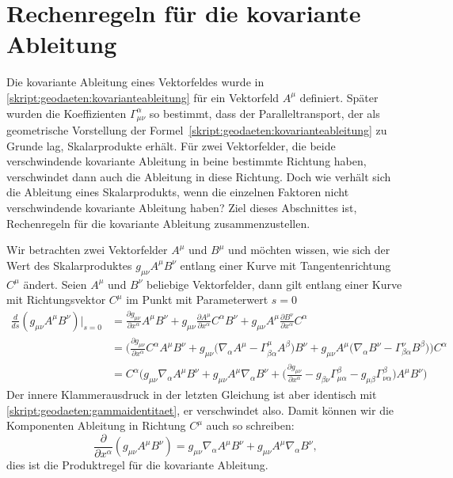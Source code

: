 \section{Rechenregeln für die kovariante Ableitung}
Die kovariante Ableitung eines Vektorfeldes wurde in 
\eqref{skript:geodaeten:kovarianteableitung}
für ein Vektorfeld $A^\mu$ definiert.
Später wurden die Koeffizienten $\Gamma^\alpha_{\mu\nu}$ so bestimmt,
dass der Paralleltransport, der als geometrische Vorstellung der
Formel~\eqref{skript:geodaeten:kovarianteableitung} zu Grunde lag,
Skalarprodukte erhält.
Für zwei Vektorfelder, die beide verschwindende
kovariante Ableitung in beine bestimmte Richtung haben,
verschwindet dann auch die Ableitung in diese Richtung.
Doch wie verhält sich die Ableitung eines Skalarprodukts, wenn
die einzelnen Faktoren nicht verschwindende kovariante Ableitung haben?
Ziel dieses Abschnittes ist, Rechenregeln für die kovariante Ableitung
zusammenzustellen.

Wir betrachten zwei Vektorfelder $A^\mu$ und $B^\mu$ und möchten wissen,
wie sich der Wert des Skalarproduktes $g_{\mu\nu}A^\mu B^\nu$ entlang
einer Kurve mit Tangentenrichtung $C^\mu$ ändert.
Seien $A^\mu$  und $B^\nu$ beliebige Vektorfelder,
dann gilt entlang einer Kurve mit
Richtungsvektor $C^\mu$ im Punkt mit Parameterwert $s=0$
\begin{align*}
\frac{d}{ds}(g_{\mu\nu}A^\mu B^\nu)\bigg|_{s=0}
&=
\frac{\partial g_{\mu\nu}}{\partial x^\alpha}A^\mu B^\nu
+
g_{\mu\nu}\frac{\partial A^\mu}{\partial x^\alpha}C^\alpha B^\nu
+
g_{\mu\nu}A^\mu \frac{\partial B^\nu}{\partial x^\alpha}C^\alpha
\\
&=
\biggl(
\frac{\partial g_{\mu\nu}}{\partial x^\alpha}C^\alpha A^\mu B^\nu
+
g_{\mu\nu}
\biggl(\nabla_\alpha A^\mu - \Gamma^\mu_{\beta\alpha}A^\beta \biggr)
B^\nu
+
g_{\mu\nu}A^\mu \biggl(\nabla_\alpha B^\nu-\Gamma^\nu_{\beta\alpha}B^\beta\biggr)
\biggr)C^\alpha
\\
&=
C^\alpha
\biggl(
g_{\mu\nu}\nabla_\alpha A^\mu B^\nu
+
g_{\mu\nu}A^\mu\nabla_\alpha B^\nu
+
\biggl(
\frac{\partial g_{\mu\nu}}{\partial x^\alpha}
-g_{\beta\nu}\Gamma^\beta_{\mu\alpha}
-g_{\mu\beta}\Gamma^\beta_{\nu\alpha}
\biggr)A^\mu B^\nu
\biggr)
\end{align*}
Der innere Klammerausdruck in der letzten Gleichung ist aber identisch
mit \eqref{skript:geodaeten:gammaidentitaet}, er verschwindet also.
Damit können wir die Komponenten Ableitung in Richtung $C^\mu$ auch
so schreiben:
\[
\frac{\partial}{\partial x^\alpha}
(g_{\mu\nu}A^\mu B^\nu)
=
g_{\mu\nu}\nabla_\alpha A^\mu B^\nu
+
g_{\mu\nu}A^\mu\nabla_\alpha B^\nu,
\]
dies ist die Produktregel für die kovariante Ableitung.

